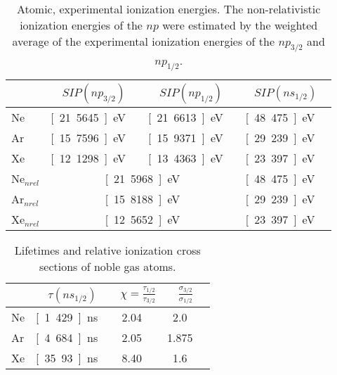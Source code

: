 \begin{appendix}
\begin{table}[h!]
 \caption{Atomic, experimental ionization energies.
          The non-relativistic ionization energies of the
          $np$ were estimated by the weighted average of the experimental
          ionization energies of the $np_{3/2}$ and $np_{1/2}$.}
 \centering
 \begin{tabular}{lcrcrcr}
  \bottomrule
     & \multicolumn{2}{c}{$SIP(np_{3/2})$} & \multicolumn{2}{c}{$SIP(np_{1/2})$} & \multicolumn{2}{c}{$SIP(ns_{1/2})$} \\
  \midrule
   Ne& \unit[21.5645]{eV} & \cite{NIST2014} & \unit[21.6613]{eV} & \cite{NIST2014} & \unit[48.475]{eV} & \cite{NIST2014}\\
   Ar& \unit[15.7596]{eV} & \cite{NIST2014} & \unit[15.9371]{eV} & \cite{NIST2014} & \unit[29.239]{eV} & \cite{NIST2014}\\
   Xe& \unit[12.1298]{eV} & \cite{NIST2014} & \unit[13.4363]{eV} & \cite{NIST2014} & \unit[23.397]{eV} & \cite{Lauer99} \\
  \midrule
   Ne$_{nrel}$ & \multicolumn{4}{c}{\unit[21.5968]{eV}} & \unit[48.475]{eV} &   \\
   Ar$_{nrel}$ & \multicolumn{4}{c}{\unit[15.8188]{eV}} & \unit[29.239]{eV} &   \\
   Xe$_{nrel}$ & \multicolumn{4}{c}{\unit[12.5652]{eV}} & \unit[23.397]{eV} &   \\
  \bottomrule
 \end{tabular}
 \label{table:noble_atom_ionization}
\end{table}

\begin{table}[h!]
 \caption{Lifetimes and relative ionization cross sections of
          noble gas atoms.}
 \centering
 \begin{tabular}{lcrcrcr}
  \toprule
      & \multicolumn{2}{c}{$\tau(ns_{1/2})$} & \multicolumn{2}{c}{$\chi=\frac{\tau_{1/2}}{\tau_{3/2}}$} & \multicolumn{2}{c}{$\frac{\sigma_{3/2}}{\sigma_{1/2}}$} \\
  \midrule
   Ne & \unit[1.429]{ns} & \cite{Lauer99} & 2.04 & \cite{Jans97} & 2.0   & \\
   Ar & \unit[4.684]{ns} & \cite{Lauer99} & 2.05 & \cite{Jans97} & 1.875 & \cite{Codling80} \\
   Xe & \unit[35.93]{ns} & \cite{Lauer99} & 8.40 & \cite{Luyken72} & 1.6 & \cite{Krause81} \\
  \bottomrule
 \end{tabular}
 \label{table:noble_atom_properties}
\end{table}


\end{appendix}
